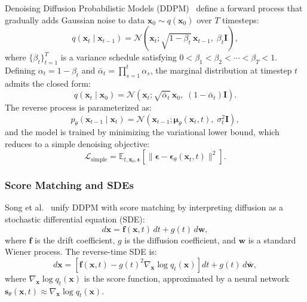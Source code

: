 \documentclass[12pt,a4paper]{article}
\providecommand{\E}{}
\renewcommand{\E}{\mathbb{E}}
\newcommand{\bx}{\bm{x}}
\newcommand{\bep}{\bm{\epsilon}}
\newcommand{\bmu}{\bm{\mu}}
\newcommand{\cN}{\mathcal{N}}
\newcommand{\cL}{\mathcal{L}}
\begin{document}
Denoising Diffusion Probabilistic Models (DDPM)~\cite{ho2020ddpm} define a forward process that gradually adds Gaussian noise to data $\bx_0 \sim q(\bx_0)$ over $T$ timesteps:
\begin{equation}\label{eq:ddpm_forward}
    q(\bx_t \mid \bx_{t-1}) = \cN(\bx_t; \sqrt{1 - \beta_t}\, \bx_{t-1},\; \beta_t \bm{I}),
\end{equation}
where $\{\beta_t\}_{t=1}^T$ is a variance schedule satisfying $0 < \beta_1 < \beta_2 < \cdots < \beta_T < 1$. Defining $\alpha_t = 1 - \beta_t$ and $\bar{\alpha}_t = \prod_{s=1}^t \alpha_s$, the marginal distribution at timestep $t$ admits the closed form:
\begin{equation}\label{eq:ddpm_marginal}
    q(\bx_t \mid \bx_0) = \cN(\bx_t; \sqrt{\bar{\alpha}_t}\, \bx_0,\; (1 - \bar{\alpha}_t)\bm{I}).
\end{equation}
The reverse process is parameterized as:
\begin{equation}\label{eq:ddpm_reverse}
    p_\theta(\bx_{t-1} \mid \bx_t) = \cN(\bx_{t-1}; \bmu_\theta(\bx_t, t),\; \sigma_t^2 \bm{I}),
\end{equation}
and the model is trained by minimizing the variational lower bound, which reduces to a simple denoising objective:
\begin{equation}\label{eq:ddpm_loss}
    \cL_{\text{simple}} = \E_{t, \bx_0, \bep}\left[\|\bep - \bep_\theta(\bx_t, t)\|^2\right].
\end{equation}

\subsubsection{Score Matching and SDEs}

Song et al.~\cite{song2021scorebased} unify DDPM with score matching by interpreting diffusion as a stochastic differential equation (SDE):
\begin{equation}\label{eq:forward_sde}
    d\bx = \bm{f}(\bx, t)\, dt + g(t)\, d\bm{w},
\end{equation}
where $\bm{f}$ is the drift coefficient, $g$ is the diffusion coefficient, and $\bm{w}$ is a standard Wiener process. The reverse-time SDE is:
\begin{equation}\label{eq:reverse_sde}
    d\bx = \left[\bm{f}(\bx, t) - g(t)^2 \nabla_{\bx} \log q_t(\bx)\right] dt + g(t)\, d\bar{\bm{w}},
\end{equation}
where $\nabla_{\bx} \log q_t(\bx)$ is the score function, approximated by a neural network $\bm{s}_\theta(\bx, t) \approx \nabla_{\bx} \log q_t(\bx)$.
\end{document}
